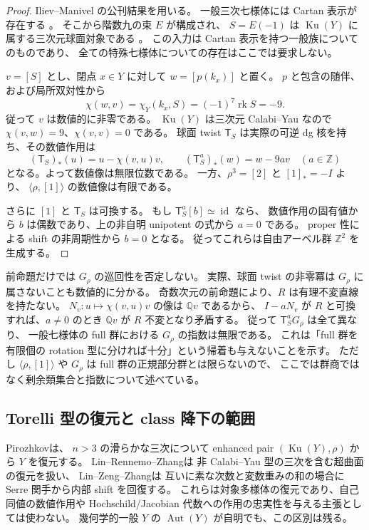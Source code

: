 \begin{proof}
Iliev--Manivel の公刊結果を用いる。
一般三次七様体には Cartan 表示が存在する
\cite[Proposition~3.1]{NFMIlievManivelSevenfold}。
そこから階数九の束 $E$ が構成され、
$S=E(-1)$ は $\operatorname{Ku}(Y)$ に属する三次元球面対象である
\cite[Theorem~3.4, Proposition~5.2, Corollary~5.3]{NFMIlievManivelSevenfold}。
この入力は Cartan 表示を持つ一般族についてのものであり、
全ての特殊七様体についての存在はここでは要求しない。

$v=[S]$ とし、閉点 $x\in Y$ に対して $w=[p(k_x)]$ と置く。
$p$ と包含の随伴、および局所双対性から
\[
 \chi(w,v)=\chi_Y(k_x,S)=(-1)^7\operatorname{rk}S=-9.
\]
従って $v$ は数値的に非零である。
$\operatorname{Ku}(Y)$ は三次元 Calabi--Yau なので
$\chi(v,w)=9$、$\chi(v,v)=0$ である。
球面 twist $\mathsf T_S$ は実際の可逆 dg 核を持ち、その数値作用は
\[
 (\mathsf T_S)_*(u)=u-\chi(v,u)v,
 \qquad (\mathsf T_S^a)_*(w)=w-9av\quad(a\in\mathbb Z)
\]
となる。よって数値像は無限位数である。
一方、$\rho^3=[2]$ と $[1]_*=-I$ より、
$\langle\rho,[1]\rangle$ の数値像は有限である。

さらに $[1]$ と $\mathsf T_S$ は可換する。
もし $\mathsf T_S^a[b]\simeq\operatorname{id}$ なら、
数値作用の固有値から $b$ は偶数であり、上の非自明 unipotent の式から $a=0$ である。
proper 性による shift の非周期性から $b=0$ となる。
従ってこれらは自由アーベル群 $\mathbb Z^2$ を生成する。
\end{proof}

\begin{remark}
前命題だけでは $G_\rho$ の巡回性を否定しない。
実際、球面 twist の非零冪は $G_\rho$ に属さないことも数値的に分かる。
奇数次元の前命題により、$R$ は有理不変直線を持たない。
$N_v:u\mapsto\chi(v,u)v$ の像は $\mathbb Qv$ であるから、
$I-aN_v$ が $R$ と可換すれば、$a\ne0$ のとき
$\mathbb Qv$ が $R$ 不変となり矛盾する。
従って $\mathsf T_S^a G_\rho$ は全て異なり、
一般七様体の full 群における $G_\rho$ の指数は無限である。
これは「full 群を有限個の rotation 型に分ければ十分」という帰着も与えないことを示す。
ただし $\langle\rho,[1]\rangle$ や $G_\rho$ は full 群の正規部分群とは限らないので、
ここでは群商ではなく剰余類集合と指数について述べている。
\end{remark}

\subsection{Torelli 型の復元と class 降下の範囲}

Pirozhkov\cite[Theorem~1.2 (= Theorem~5.3)]{NFPirozhkov}は、
$n>3$ の滑らかな三次について enhanced pair
$(\operatorname{Ku}(Y),\rho)$ から $Y$ を復元する。
Lin--Rennemo--Zhang\cite[Theorem~1.3]{NFMLinRennemoZhangWeighted}は
非 Calabi--Yau 型の三次を含む超曲面の復元を扱い、
Lin--Zeng--Zhang\cite[Proposition~2.1, Remark~2.2]{NFMLinZengZhangSingularity}は
互いに素な次数と変数重みの和の場合に Serre 関手から内部 shift を回復する。
これらは対象多様体の復元であり、自己同値の数値作用や
Hochschild/Jacobian 代数への作用の忠実性を与える主張としては使わない。
幾何学的一般 $Y$ の $\operatorname{Aut}(Y)$ が自明でも、この区別は残る。

